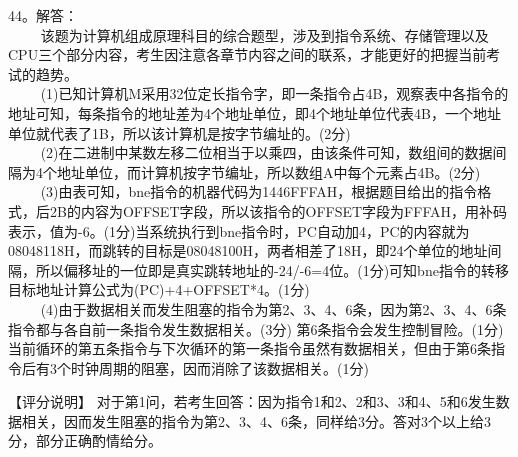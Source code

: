 44。解答： \\
$\qquad$ 该题为计算机组成原理科目的综合题型，涉及到指令系统、存储管理以及CPU三个部分内容，考生因注意各章节内容之间的联系，才能更好的把握当前考试的趋势。 \\
$\qquad$ (1)已知计算机M采用32位定长指令字，即一条指令占4B，观察表中各指令的地址可知，每条指令的地址差为4个地址单位，即4个地址单位代表4B，一个地址单位就代表了1B，所以该计算机是按字节编址的。(2分) \\
$\qquad$ (2)在二进制中某数左移二位相当于以乘四，由该条件可知，数组间的数据间隔为4个地址单位，而计算机按字节编址，所以数组A中每个元素占4B。(2分) \\
$\qquad$ (3)由表可知，bne指令的机器代码为1446FFFAH，根据题目给出的指令格式，后2B的内容为OFFSET字段，所以该指令的OFFSET字段为FFFAH，用补码表示，值为-6。(1分)当系统执行到bne指令时，PC自动加4，PC的内容就为08048118H，而跳转的目标是08048100H，两者相差了18H，即24个单位的地址间隔，所以偏移址的一位即是真实跳转地址的-24/-6=4位。(1分)可知bne指令的转移目标地址计算公式为(PC)+4+OFFSET*4。(1分) \\
$\qquad$ (4)由于数据相关而发生阻塞的指令为第2、3、4、6条，因为第2、3、4、6条指令都与各自前一条指令发生数据相关。(3分) 第6条指令会发生控制冒险。(1分) 当前循环的第五条指令与下次循环的第一条指令虽然有数据相关，但由于第6条指令后有3个时钟周期的阻塞，因而消除了该数据相关。(1分) 

【评分说明】 对于第1问，若考生回答：因为指令1和2、2和3、3和4、5和6发生数据相关，因而发生阻塞的指令为第2、3、4、6条，同样给3分。答对3个以上给3分，部分正确酌情给分。

